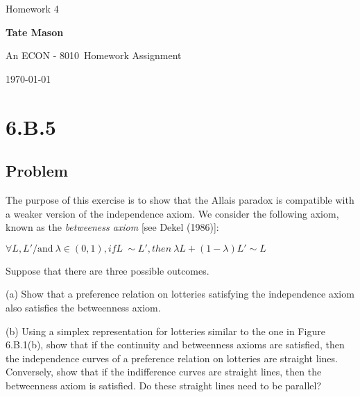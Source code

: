 \documentclass[10pt, a4paper]{article}
\newcommand\course{ECON - 8010}                            %
\newcommand\hwnumber{ 4}                                 %
\newcommand\Information{Tate Mason}                        %
\begin{document}
  \begin{titlepage}
    \begin{center}
      \vspace*{3cm}
            
        \vspace{1cm}
        \huge
        Homework \hwnumber
            
        \vspace{1.5cm}
        \Large
            
        \textbf{\Information}                      %
            
        \vfill
        
        An \course \ Homework Assignment
            
        \vspace{1cm}
        \Large

        
        \today
            
    \end{center}
  \end{titlepage}

  \newpage
  \section*{6.B.5}
    \subsection*{Problem}
    The purpose of this exercise is to show that the Allais paradox is compatible with a weaker version of the independence axiom. We consider the following axiom, known as the \textit{betweeness axiom} [see Dekel (1986)]:
    \begin{center}
      $\forall L,L' / \text{and} \ \lambda \in(0,1), if L\ \sim L', then\ \lambda L+(1-\lambda)L'\sim L$
    \end{center}
    Suppose that there are three possible outcomes.

    (a) Show that a preference relation on lotteries satisfying the independence axiom also satisfies the betweenness axiom.

    (b) Using a simplex representation for lotteries similar to the one in Figure 6.B.1(b), show that if the continuity and betweenness axioms are satisfied, then the independence curves of a preference relation on lotteries are straight lines. Conversely, show that if the indifference curves are straight lines, then the betweenness axiom is satisfied. Do these straight lines need to be parallel?
\end{document}
